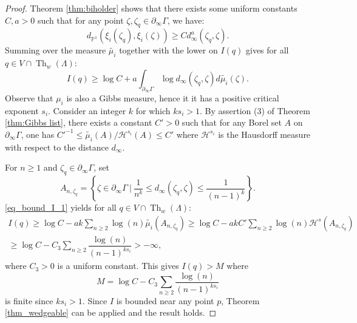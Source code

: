 \documentclass[12pt]{amsbook}%
\theoremstyle{definition}
\theoremstyle{remark}
\numberwithin{section}{chapter}
\numberwithin{subsection}{section}
\numberwithin{figure}{chapter}
\DeclareMathOperator{\Th}{Th}
\def\bP{{\mathbb{P}}}
\def\Ga{\Gamma}
\begin{document}
{{\begin{proof}
 Theorem \ref{thm:biholder} shows that there exists some uniform constants $C,a > 0$ such that for any point $\zeta, \zeta_q \in \partial_\infty \Ga$, we have: 
\begin{equation*}
d_{\bP^1}(\xi_i(\zeta_q), \xi_i(\zeta)) \geqslant C d_\infty^a(\zeta_q, \zeta).  
\end{equation*}
Summing over the measure $\tilde{\mu_i}$ together with the lower on $I(q)$ gives for all $q\in V\cap \Th_w(\Lambda)$: 
\begin{equation} \label{eq_bound_I_1}
I(q)  \geqslant  \log C + a \int_{\partial_\infty \Ga} \log d_{\infty}(\zeta_q, \zeta) d\tilde{\mu_i}(\zeta).
\end{equation}
Observe that $\mu_i$ is also a Gibbs measure, hence it  
it has a positive critical exponent $s_i$. Consider an integer  $k$ for which $k s_i > 1 $.  
By assertion (3) of Theorem \ref{thm:Gibbs list}, there exists a constant $C'> 0$ such that for any Borel set $A$ on $\partial_\infty \Ga$, one has $C'^{-1} \leqslant \tilde{\mu_i}(A)/\mathcal{H}^{s_i}(A) \leqslant C'$ where $\mathcal{H}^{s_i}$ is the Hausdorff measure with respect to the distance $d_\infty$. 

For $n \geqslant 1$ and $\zeta_q\in \partial_\infty \Ga$, set $$A_{n,\zeta_q} = \left \{ \zeta\in \partial_\infty \Ga \ | \  \dfrac{1}{n^k}\leqslant d_\infty(\zeta_q, \zeta) \leqslant \dfrac{1}{(n-1)^k} \right  \}.$$ 
\eqref{eq_bound_I_1} yields  for all $q \in V \cap \Th_w(\Lambda)$: 
\begin{multline*}
I(q) \geqslant \log C - a k \sum_{n\geqslant 2} \log (n) \tilde{\mu_i}(A_{n,\zeta_q}) 
   \geqslant \log C - a k C' \sum_{n \geqslant 2} \log(n) \mathcal{H}^{s}(A_{n,\zeta_q}) \\
     \geqslant \log C - C_3 \sum_{n \geqslant 2} \dfrac{\log (n)}{(n-1)^{ks_i}} > -\infty,  
\end{multline*}
where $C_3> 0$ is a uniform constant. 
This gives $I(q) > M$ where 
$$
M =\log C -C_3 \sum_{n \geqslant 2} \dfrac{\log (n)}{(n-1)^{ks_i}}$$ 
is finite since $ks_i >1$. Since $I$ is bounded near any point $p$, Theorem \ref{thm_wedgeable} can be applied and the result holds.
%
\end{proof}






}}
\end{document}
